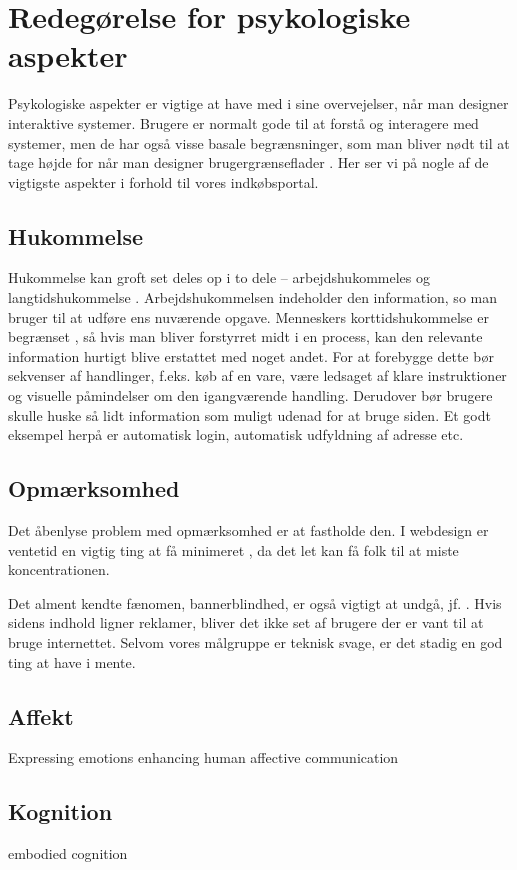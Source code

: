 \section{Redegørelse for psykologiske aspekter}

Psykologiske aspekter er vigtige at have med i sine overvejelser, når man
designer interaktive systemer. Brugere er normalt gode til at forstå og
interagere med systemer, men de har også visse basale begrænsninger, som
man bliver nødt til at tage højde for når man designer brugergrænseflader
\cite[s. 531]{Benyon2010}. Her ser vi på nogle af de vigtigste aspekter i
forhold til vores indkøbsportal.

\subsection{Hukommelse}

Hukommelse kan groft set deles op i to dele -- arbejdshukommeles og
langtidshukommelse \cite[s. 536]{Benyon2010}. Arbejdshukommelsen indeholder
den information, so man bruger til at udføre ens nuværende opgave.
Menneskers korttidshukommelse er begrænset \cite[s. 536]{Benyon2010}, så
hvis man bliver forstyrret midt i en process, kan den relevante information
hurtigt blive erstattet med noget andet. For at forebygge dette bør sekvenser
af handlinger, f.eks. køb af en vare, være ledsaget af klare instruktioner
og visuelle påmindelser om den igangværende handling. Derudover bør brugere
skulle huske så lidt information som muligt udenad for at bruge siden. Et
godt eksempel herpå er automatisk login, automatisk udfyldning af adresse
etc.

\subsection{Opmærksomhed}

Det åbenlyse problem med opmærksomhed er at fastholde den. I webdesign er
ventetid en vigtig ting at få minimeret \cite[box 22.7]{Benyon2010}, da det
let kan få folk til at miste koncentrationen.

Det alment kendte fænomen, bannerblindhed, er også vigtigt at undgå, jf.
\cite{Grue}. Hvis sidens indhold ligner reklamer, bliver det ikke set af
brugere der er vant til at bruge internettet. Selvom vores målgruppe er
teknisk svage, er det stadig en god ting at have i mente.

\subsection{Affekt}
Expressing emotions
enhancing human affective communication


\subsection{Kognition}
embodied cognition



